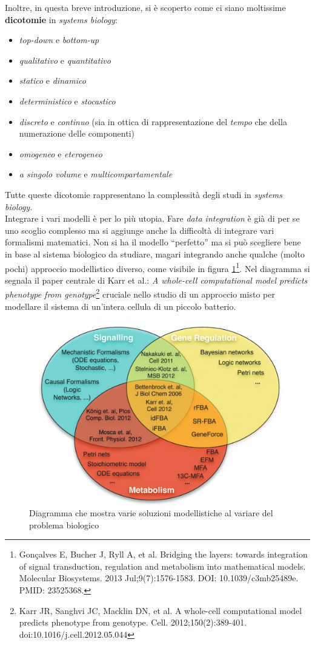 \documentclass[a4paper,12pt, oneside]{book}
\begin{document}
Inoltre, in questa breve introduzione, si è scoperto come ci siano moltissime
\textbf{dicotomie} in \textit{systems biology}:
\begin{itemize}
  \item \textit{top-down} e \textit{bottom-up}
  \item \textit{qualitativo} e \textit{quantitativo}
  \item \textit{statico} e \textit{dinamico}
  \item \textit{deterministico} e \textit{stocastico}
  \item \textit{discreto} e \textit{continuo} (sia in ottica di
  rappresentazione del \textit{tempo} che della numerazione delle componenti)
  \item \textit{omogeneo} e \textit{eterogeneo}
  \item \textit{a singolo volume} e \textit{multicompartamentale}
\end{itemize}
Tutte queste dicotomie rappresentano la complessità degli studi in
\textit{systems biology}.\\
Integrare i vari modelli è per lo più utopia. Fare \textit{data integration} è
già di per se uno scoglio complesso ma si aggiunge anche la difficoltà di
integrare vari formalismi matematici. Non si ha il modello ``perfetto'' ma si
può scegliere bene in base al sistema biologico da studiare, magari integrando
anche qualche (molto pochi) approccio modellistico diverso, come visibile in
figura \ref{fig:pap}\footnote{Gonçalves E, Bucher J, Ryll A, et al. Bridging the
  layers: towards integration of signal transduction, regulation and metabolism
  into mathematical models. Molecular Biosystems. 2013 Jul;9(7):1576-1583. DOI:
  10.1039/c3mb25489e. PMID: 23525368. }. Nel diagramma si segnala il paper
centrale di Karr et al.: \textit{A whole-cell computational model predicts
  phenotype from genotype}\footnote{Karr JR, Sanghvi JC, Macklin DN, et al. A
  whole-cell computational model predicts phenotype from
  genotype. Cell. 2012;150(2):389-401. doi:10.1016/j.cell.2012.05.044} cruciale
nello studio di un approccio misto per modellare il sistema di un'intera cellula
di un piccolo batterio.
\begin{figure}
  \centering
  \includegraphics[scale = 0.25]{img/papers.jpg}
  \caption{Diagramma che mostra varie soluzioni modellistiche al variare del
    problema biologico}
  \label{fig:pap}
\end{figure}
\end{document}
